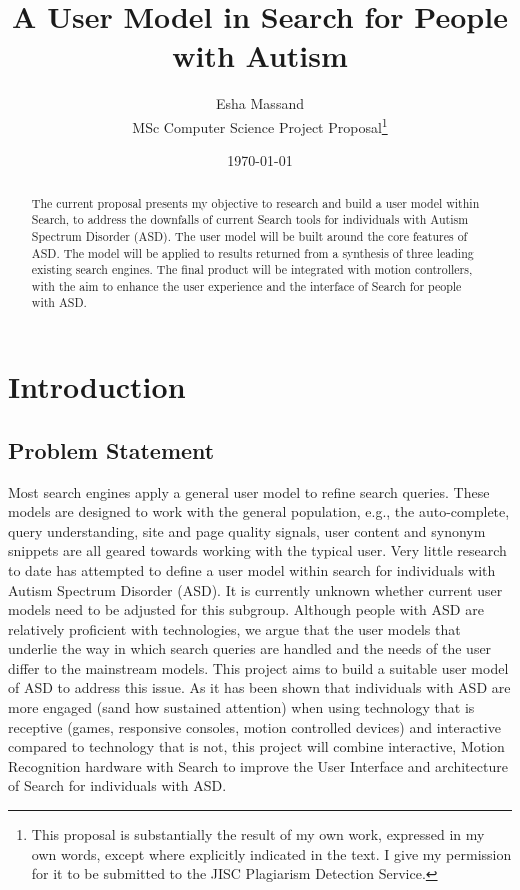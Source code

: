 \documentclass[10pt]{article}
\begin{document}
\title{A User Model in Search for People with Autism}
\author{Esha Massand\\
MSc Computer Science Project Proposal\footnote{This proposal is substantially the result of my own work, expressed in my own words, except where explicitly indicated in the text. I give my permission for it to be submitted to the JISC Plagiarism Detection Service. }}
\date{\today}
\maketitle


\begin{abstract}
The current proposal presents my objective to research and build a user model within Search, to address the downfalls of current Search tools for individuals with Autism Spectrum Disorder (ASD). The user model will be built around the core features of ASD. The model will be applied to results returned from a synthesis of three leading existing search engines. The final product will be integrated with motion controllers, with the aim to enhance the user experience and the interface of Search for people with ASD.
\end{abstract}

\tableofcontents

\section{Introduction}
\subsection{Problem Statement} \label{prob}
Most search engines apply a general user model to refine search queries. These models are designed to work with the general population, e.g., the auto-complete, query understanding, site and page quality signals, user content and synonym snippets are all geared towards working with the typical user. Very little research to date has attempted to define a user model within search for individuals with Autism Spectrum Disorder (ASD). It is currently unknown whether current user models need to be adjusted for this subgroup. Although people with ASD are relatively proficient with technologies, we argue that the user models that underlie the way in which search queries are handled and the needs of the user differ to the mainstream models. This project aims to build a suitable user model of ASD to address this issue.
As it has been shown that individuals with ASD are more engaged (sand how sustained attention) when using technology that is receptive (games, responsive consoles, motion controlled devices) and interactive compared to technology that is not, this project will combine interactive, Motion Recognition hardware with Search to improve the User Interface and architecture of Search for individuals with ASD.
\end{document}

